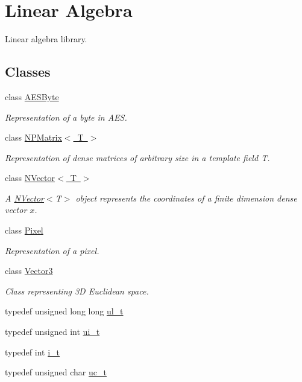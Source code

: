\hypertarget{group___n_algebra}{}\section{Linear Algebra}
\label{group___n_algebra}


Linear algebra library.  


\subsection*{Classes}
\begin{DoxyCompactItemize}
\item 
class \mbox{\hyperlink{class_a_e_s_byte}{A\+E\+S\+Byte}}
\begin{DoxyCompactList}\small\item\em Representation of a byte in A\+ES. \end{DoxyCompactList}\item 
class \mbox{\hyperlink{class_n_p_matrix}{N\+P\+Matrix$<$ T $>$}}
\begin{DoxyCompactList}\small\item\em Representation of dense matrices of arbitrary size in a template field {\ttfamily T}. \end{DoxyCompactList}\item 
class \mbox{\hyperlink{class_n_vector}{N\+Vector$<$ T $>$}}
\begin{DoxyCompactList}\small\item\em A {\ttfamily \mbox{\hyperlink{class_n_vector}{N\+Vector}}$<$T$>$} object represents the coordinates of a finite dimension dense vector $ x $. \end{DoxyCompactList}\item 
class \mbox{\hyperlink{class_pixel}{Pixel}}
\begin{DoxyCompactList}\small\item\em Representation of a pixel. \end{DoxyCompactList}\item 
class \mbox{\hyperlink{class_vector3}{Vector3}}
\begin{DoxyCompactList}\small\item\em Class representing 3D Euclidean space. \end{DoxyCompactList}\end{DoxyCompactItemize}
\begin{DoxyCompactItemize}
\item 
typedef unsigned long long \mbox{\hyperlink{group___n_algebra_ga1b140a2034db3f5dfe18a987745df43a}{ul\+\_\+t}}
\item 
typedef unsigned int \mbox{\hyperlink{group___n_algebra_gaf725d9f5d457c0cbd02e1778cb2294a8}{ui\+\_\+t}}
\item 
typedef int \mbox{\hyperlink{group___n_algebra_ga72a56cddd77907733a7766bd5e332f53}{i\+\_\+t}}
\item 
typedef unsigned char \mbox{\hyperlink{group___n_algebra_ga358b32a8fe6aec4f963fe3b413689d12}{uc\+\_\+t}}
\end{DoxyCompactItemize}



